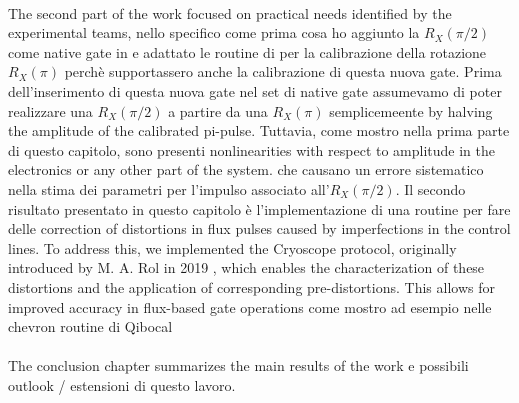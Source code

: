 \paragraph{}
The second part of the work focused on practical needs identified by the experimental teams, nello specifico come prima cosa ho aggiunto la $R_X(\pi/2)$ come native gate in \Qibolab e adattato le routine di \Qibocal per la calibrazione della rotazione $R_X(\pi)$ perchè supportassero anche la calibrazione di questa nuova gate.
Prima dell'inserimento di questa nuova gate nel set di native gate assumevamo di poter realizzare una $R_X(\pi/2)$ a partire da una $R_X(\pi)$ semplicemeente by halving the amplitude of the calibrated pi-pulse.
Tuttavia, come mostro nella prima parte di questo capitolo, sono presenti nonlinearities with respect to amplitude in the electronics or any other part of the system. che causano un errore sistematico nella stima dei parametri per l'impulso associato all'$R_X(\pi/2)$.
Il secondo risultato presentato in questo capitolo è l'implementazione di una routine per fare delle correction of distortions in flux pulses caused by imperfections in the control lines. 
To address this, we implemented the Cryoscope protocol, originally introduced by M. A. Rol in 2019 \cite{rol_time-domain_2020}, which enables the characterization of these distortions and the application of corresponding pre-distortions. 
This allows for improved accuracy in flux-based gate operations come mostro ad esempio nelle chevron routine di Qibocal

\paragraph{}
The conclusion chapter summarizes the main results of the work e possibili outlook / estensioni di questo lavoro.